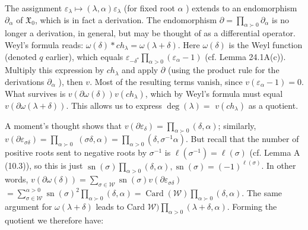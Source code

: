 \documentclass[10pt]{article}
\begin{document}
The assignment $\varepsilon_{\lambda} \mapsto(\lambda, \alpha) \varepsilon_{\lambda}$ (for fixed root $\alpha$ ) extends to an endomorphism $\partial_{\alpha}$ of $\mathfrak{X}_{0}$, which is in fact a derivation. The endomorphism $\partial=\prod_{\alpha \succ 0} \partial_{\alpha}$ is no longer a derivation, in general, but may be thought of as a differential operator. Weyl's formula reads: $\omega(\delta) * c h_{\lambda}=\omega(\lambda+\delta)$. Here $\omega(\delta)$ is the Weyl function (denoted $q$ earlier), which equals $\varepsilon_{-\delta^{*}} \prod_{\alpha>0}\left(\varepsilon_{\alpha}-1\right)$ (cf. Lemma 24.1A(c)). Multiply this expression by $c h_{\lambda}$ and apply $\partial$ (using the product rule for the derivations $\partial_{\alpha}$ ), then $v$. Most of the resulting terms vanish, since $v\left(\varepsilon_{\alpha}-1\right)=0$. What survives is $v(\partial \omega(\delta)) v\left(c h_{\lambda}\right)$, which by Weyl's formula must equal $v(\partial \omega(\lambda+\delta))$. This allows us to express $\operatorname{deg}(\lambda)=$ $v\left(c h_{\lambda}\right)$ as a quotient.

A moment's thought shows that $v\left(\partial \varepsilon_{\delta}\right)=\prod_{\alpha \succ 0}(\delta, \alpha)$; similarly, $v\left(\partial \varepsilon_{\sigma \delta}\right)=\prod_{\alpha \succ 0}$ $(\sigma \delta, \alpha)=\prod_{\alpha>0}\left(\delta, \sigma^{-1} \alpha\right)$. But recall that the number of positive roots sent to negative roots by $\sigma^{-1}$ is $\ell\left(\sigma^{-1}\right)=\ell(\sigma)$ (cf. Lemma A (10.3)), so this is just $\operatorname{sn}(\sigma) \prod_{\alpha>0}(\delta, \alpha), \operatorname{sn}(\sigma)=(-1)^{\ell(\sigma)}$. In other words, $v(\partial \omega(\delta))=\sum_{\sigma \in \mathscr{W}} \operatorname{sn}(\sigma) v\left(\partial \varepsilon_{\sigma \delta}\right)$ $=\sum_{\sigma \in \mathscr{W}}^{\alpha>0} \operatorname{sn}(\sigma)^{2} \prod_{\alpha \succ 0}(\delta, \alpha)=\operatorname{Card}(\mathscr{W}) \prod_{\alpha \succ 0}(\delta, \alpha)$. The same argument for $\omega(\lambda+\delta)$ leads to Card $\mathscr{W}) \prod_{\alpha>0}(\lambda+\delta, \alpha)$. Forming the quotient we therefore have:
\end{document}
